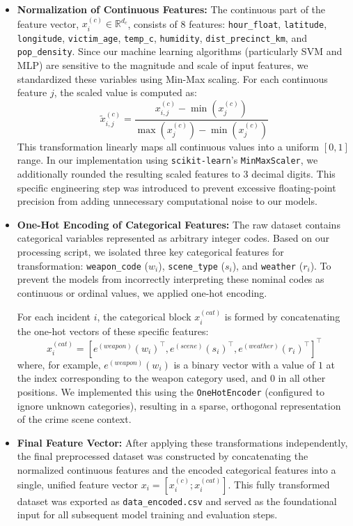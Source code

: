 \documentclass{article}
\begin{document}
\begin{itemize}
\item \textbf{Normalization of Continuous Features:}
The continuous part of the feature vector, $x_{i}^{(c)} \in \mathbb{R}^{d_c}$, consists of 8 features: \texttt{hour\_float}, \texttt{latitude}, \texttt{longitude}, \texttt{victim\_age}, \texttt{temp\_c}, \texttt{humidity}, \texttt{dist\_precinct\_km}, and \texttt{pop\_density}. Since our machine learning algorithms (particularly SVM and MLP) are sensitive to the magnitude and scale of input features, we standardized these variables using Min-Max scaling. For each continuous feature $j$, the scaled value is computed as:
\begin{equation}
    \tilde{x}_{i,j}^{(c)} = \frac{x_{i,j}^{(c)} - \min(x_{j}^{(c)})}{\max(x_{j}^{(c)}) - \min(x_{j}^{(c)})}
\end{equation}
This transformation linearly maps all continuous values into a uniform $[0, 1]$ range. In our implementation using \texttt{scikit-learn}'s \texttt{MinMaxScaler}, we additionally rounded the resulting scaled features to 3 decimal digits. This specific engineering step was introduced to prevent excessive floating-point precision from adding unnecessary computational noise to our models.

\item \textbf{One-Hot Encoding of Categorical Features:}
The raw dataset contains categorical variables represented as arbitrary integer codes. Based on our processing script, we isolated three key categorical features for transformation: \texttt{weapon\_code} ($w_i$), \texttt{scene\_type} ($s_i$), and \texttt{weather} ($r_i$). To prevent the models from incorrectly interpreting these nominal codes as continuous or ordinal values, we applied one-hot encoding. 

For each incident $i$, the categorical block $x_{i}^{(cat)}$ is formed by concatenating the one-hot vectors of these specific features:
\begin{equation}
    x_{i}^{(cat)} = \left[ e^{(weapon)}(w_i)^\top, e^{(scene)}(s_i)^\top, e^{(weather)}(r_i)^\top \right]^\top
\end{equation}
where, for example, $e^{(weapon)}(w_i)$ is a binary vector with a value of $1$ at the index corresponding to the weapon category used, and $0$ in all other positions. We implemented this using the \texttt{OneHotEncoder} (configured to ignore unknown categories), resulting in a sparse, orthogonal representation of the crime scene context.

\item \textbf{Final Feature Vector:}
After applying these transformations independently, the final preprocessed dataset was constructed by concatenating the normalized continuous features and the encoded categorical features into a single, unified feature vector $x_i = [x_i^{(c)}; x_i^{(cat)}]$. This fully transformed dataset was exported as \texttt{data\_encoded.csv} and served as the foundational input for all subsequent model training and evaluation steps.
\end{itemize}
\end{document}
